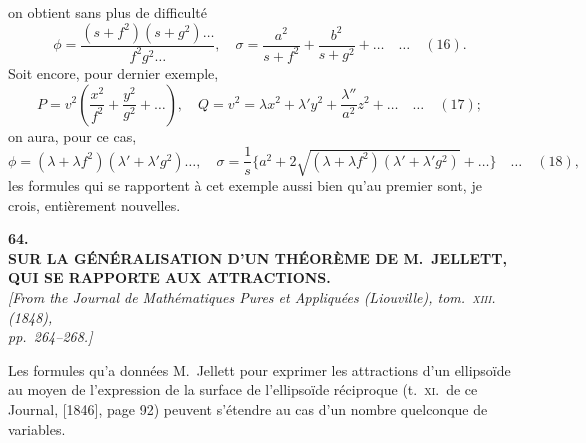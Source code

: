 \documentclass[11pt]{article}
\begin{document}

on obtient sans plus de difficult\'e
\[
\phi = \frac{(s + f^{2})(s + g^{2})\ldots}{f^{2}g^{2}\ldots},\quad \sigma = \frac{a^{2}}{s + f^{2}} + \frac{b^{2}}{s + g^{2}} + \ldots\quad\ldots\quad (16).
\]
Soit encore, pour dernier exemple,
\[
P = v^{2}\!\left(\frac{x^{2}}{f^{2}} + \frac{y^{2}}{g^{2}} + \ldots\right),\quad Q = v^{2} = \lambda x^{2} + \lambda' y^{2} + \frac{\lambda''}{a^{2}}z^{2} + \ldots\quad\ldots\quad (17);
\]
on aura, pour ce cas,
\[
\phi = (\lambda + \lambda f^{2})(\lambda' + \lambda' g^{2})\ldots,\quad \sigma = \frac{1}{s}\{a^{2} + 2\sqrt{(\lambda + \lambda f^{2})(\lambda' + \lambda' g^{2})} + \ldots\}\quad\ldots\quad (18),
\]
les formules qui se rapportent \`a cet exemple aussi bien qu'au premier sont, je crois,
enti\`erement nouvelles.

\bigskip

\begin{center}
\textbf{\large 64.}\\[0.7em]
\textbf{\large SUR LA G\'EN\'ERALISATION D'UN TH\'EOR\`EME DE M.~JELLETT,}\\[0.3em]
\textbf{\large QUI SE RAPPORTE AUX ATTRACTIONS.}\\[0.5em]
\textit{[From the Journal de Math\'ematiques Pures et Appliqu\'ees (Liouville), tom.~\textsc{xiii}. (1848),\\
pp.~264--268.]}
\end{center}

\medskip

Les formules qu'a donn\'ees M.~Jellett pour exprimer les attractions d'un ellipso\"ide
au moyen de l'expression de la surface de l'ellipso\"ide r\'eciproque (t.~\textsc{xi}.\ de ce Journal,
[1846], page 92) peuvent s'\'etendre au cas d'un nombre quelconque de variables.
\end{document}
